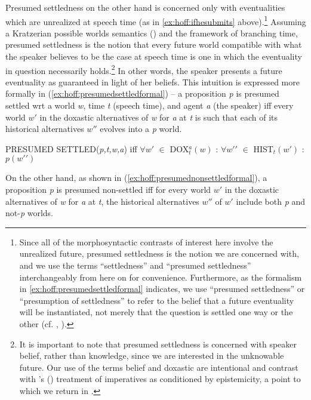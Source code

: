 \documentclass[output=paper,colorlinks,citecolor=brown]{langscibook}
\begin{document}
Presumed settledness on the other hand is concerned only with eventualities which are unrealized at speech time (as in \ref{ex:hoff:ifhesubmits} above).\footnote{Since all of the morphosyntactic contrasts of interest here involve the unrealized future, presumed settledness is the notion we are concerned with, and we use the terms ``settledness'' and ``presumed settledness'' interchangeably from here on for convenience. Furthermore, as the formalism in \ref{ex:hoff:presumedsettledformal} indicates, we use ``presumed settledness'' or ``presumption of settledness'' to refer to the belief that a future eventuality will be instantiated, not merely that the question is settled one way or the other (cf. \citeauthor{Kaufmann2002} \citeyear{Kaufmann2002}, \citeyear{Kaufmann2005}).} Assuming a Kratzerian possible worlds semantics (\citealt{Kratzer1981}) and the framework of branching time, presumed settledness is the notion that every future world compatible with what the speaker believes to be the case at speech time is one in which the eventuality in question necessarily holds.\footnote{It is important to note that presumed settledness is concerned with speaker belief, rather than knowledge, since we are interested in the unknowable future. Our use of the terms belief and doxastic are intentional and contrast with \citeauthor{Johnson2016}’s (\citeyear{Johnson2016}) treatment of imperatives as conditioned by epistemicity, a point to which we return in .} In other words, the speaker presents a future eventuality as guaranteed in light of her beliefs. This intuition is expressed more formally in (\ref{ex:hoff:presumedsettledformal}) -- a proposition \textit{p} is presumed settled wrt a world \textit{w}, time \textit{t} (speech time), and agent \textit{a} (the speaker) iff every world $w'$ in the doxastic alternatives of \textit{w} for \textit{a} at \textit{t} is such that each of its historical alternatives $w''$ evolves into a \textit{p} world.

\begin{exe}
\ex\label{ex:hoff:presumedsettledformal} PRESUMED SETTLED(\textit{p,t,w,a}) iff $\forall w \prime$ $\in$ \textsc{DOX}$_{t}^{a}(w)$ : $\forall w \prime\prime$ $\in$ \textsc{HIST}$_{t}(w\prime)$ : $p(w\prime\prime)$
\end{exe}

On the other hand, as shown in (\ref{ex:hoff:presumednonsettledformal}), a proposition \textit{p} is presumed non-settled iff for every world $w'$ in the doxastic alternatives of \textit{w} for \textit{a} at \textit{t}, the historical alternatives $w''$ of $w'$ include both \textit{p} and not-\textit{p} worlds.
\end{document}
